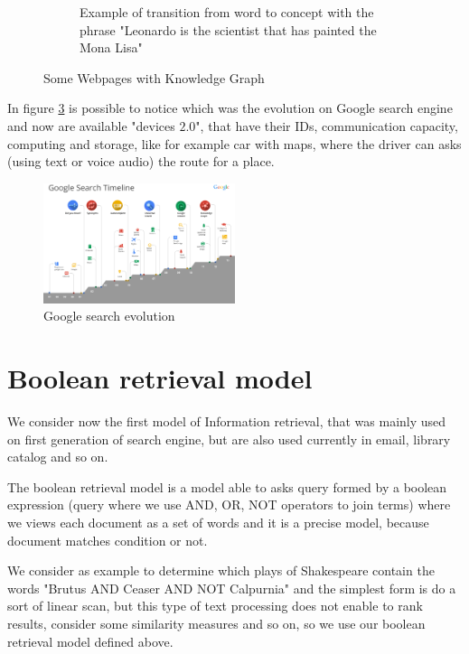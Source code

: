 \begin{description}
\begin{figure}
\begin{subfigure}{0.6\textwidth}
                                    	\caption{Example of transition from word to concept with the phrase
                                             	 "Leonardo is the scientist that has painted the Mona Lisa"}
                                    	\label{img:leonardo}
                                    \end{subfigure}
				    \caption{Some Webpages with Knowledge Graph}
				    \label{img:knowledge}
				\end{figure}
\end{description}
In figure \ref{img:googleEvolution} is possible to notice which was the evolution on Google search engine and
now are available "devices $2.0$", that have their IDs, communication capacity, computing and storage, like
for example car with maps, where the driver can asks (using text or voice audio) the route for a place.
\begin{figure}
    \includegraphics[width=0.5\textwidth]{Images/googleGeneration}
    \caption{Google search evolution}
    \label{img:googleEvolution}
\end{figure}

\section{Boolean retrieval model}
We consider now the first model of Information retrieval, that was mainly used on first generation of search engine,
but are also used currently in email, library catalog and so on.

\begin{defi}
The boolean retrieval model is a model able to asks query formed by a boolean expression (query where we use 
AND, OR, NOT operators to join terms) where we views each document as a set of words and it is a precise model,
because document matches condition or not.
\end{defi}

We consider as example to determine which plays of Shakespeare contain the words 
"Brutus AND Ceaser AND NOT Calpurnia" and the simplest form is do a sort of linear scan, but this type
of text processing does not enable to rank results, consider some similarity measures and so on, so we use 
our boolean retrieval model defined above.


